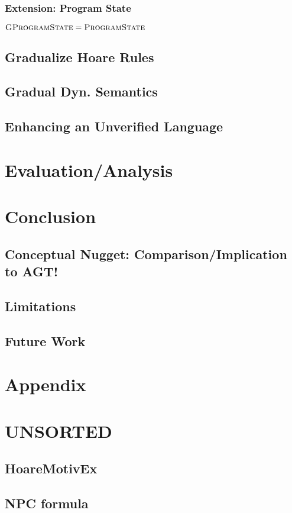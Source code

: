     \subsection{Extension: Program State}
    $\textsc{GProgramState} = \textsc{ProgramState}$

\section{Gradualize Hoare Rules}
\label{sec:gradualize-hoare-rules}


\section{Gradual Dyn. Semantics}


\section{Enhancing an Unverified Language}





\chapter{Evaluation/Analysis}
\label{ch:evaluation-analysis}


\chapter{Conclusion}
\label{ch:conclusion}


\section{Conceptual Nugget: Comparison/Implication to AGT!}

\section{Limitations}
\label{sec:limitations}


\section{Future Work}
\label{sec:future-work}


\chapter{Appendix}


\chapter{UNSORTED}

\section{HoareMotivEx}
\label{sec:hoaremotivex}


\section{NPC formula}
\label{sec:npc-formula}

